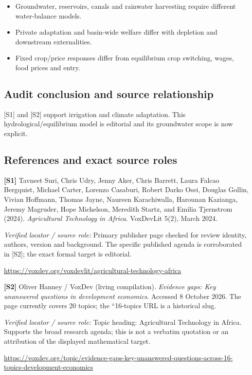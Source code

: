 \documentclass[11pt,a4paper]{article}
\begin{document}
\begin{itemize}
\item Groundwater, reservoirs, canals and rainwater harvesting require different water-balance models.
\item Private adaptation and basin-wide welfare differ with depletion and downstream externalities.
\item Fixed crop/price responses differ from equilibrium crop switching, wages, food prices and entry.
\end{itemize}

\subsection*{Audit conclusion and source relationship}

[S1] and [S2] support irrigation and climate adaptation. This hydrological/equilibrium model is editorial and its groundwater scope is now explicit.

\subsection*{References and exact source roles}

{\footnotesize\raggedright
\par\noindent\textbf{[S1]} Tavneet Suri, Chris Udry, Jenny Aker, Chris Barrett, Laura Falcao Bergquist, Michael Carter, Lorenzo Casaburi, Robert Darko Osei, Douglas Gollin, Vivian Hoffmann, Thomas Jayne, Naureen Karachiwalla, Harounan Kazianga, Jeremy Magruder, Hope Michelson, Meredith Startz, and Emilia Tjernstrom (2024). \emph{Agricultural Technology in Africa}. VoxDevLit 5(2), March 2024.\par \textit{Verified locator / source role:} Primary publisher page checked for review identity, authors, version and background. The specific published agenda is corroborated in [S2]; the exact formal target is editorial.\par \url{https://voxdev.org/voxdevlit/agricultural-technology-africa}\par\smallskip
\par\noindent\textbf{[S2]} Oliver Hanney / VoxDev (living compilation). \emph{Evidence gaps: Key unanswered questions in development economics}. Accessed 8 October 2026. The page currently covers 20 topics; the ``16-topics URL is a historical slug.\par \textit{Verified locator / source role:} Topic heading: Agricultural Technology in Africa. Supports the broad research agenda; this is not a verbatim quotation or an attribution of the displayed mathematical target.\par \url{https://voxdev.org/topic/evidence-gaps-key-unanswered-questions-across-16-topics-development-economics}\par\smallskip
}
\end{document}
